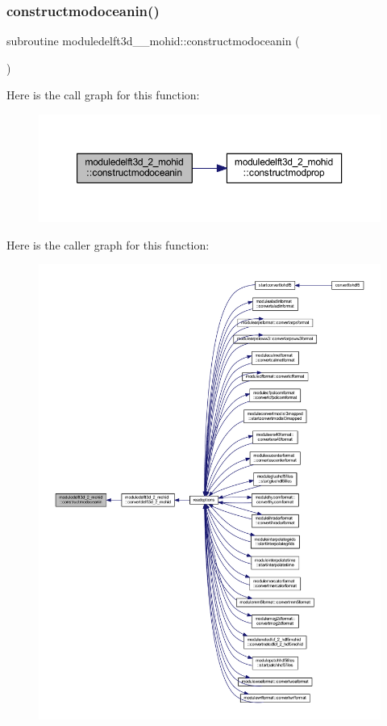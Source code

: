 \subsubsection{\texorpdfstring{constructmodoceanin()}{constructmodoceanin()}}
{\footnotesize\ttfamily subroutine moduledelft3d\+\_\+\_\+mohid\+::constructmodoceanin (\begin{DoxyParamCaption}{ }\end{DoxyParamCaption})\hspace{0.3cm}{\ttfamily [private]}}

Here is the call graph for this function\+:\nopagebreak
\begin{figure}[H]
\begin{center}
\leavevmode
\includegraphics[width=350pt]{namespacemoduledelft3d__2__mohid_ab33b3699f757f82a3a7ef54bc7cc7061_cgraph}
\end{center}
\end{figure}
Here is the caller graph for this function\+:\nopagebreak
\begin{figure}[H]
\begin{center}
\leavevmode
\includegraphics[width=350pt]{namespacemoduledelft3d__2__mohid_ab33b3699f757f82a3a7ef54bc7cc7061_icgraph}
\end{center}
\end{figure}
